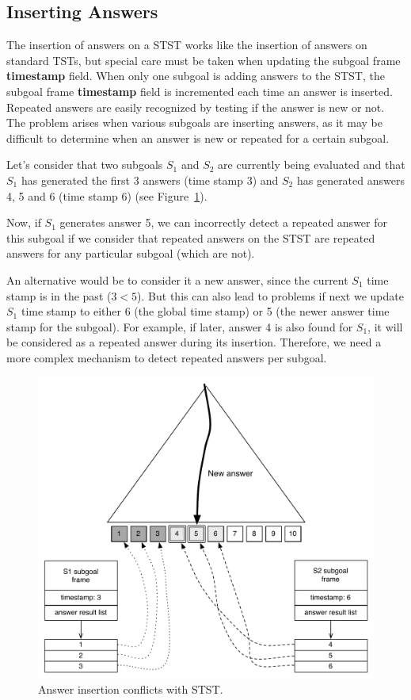 \subsection{Inserting Answers}

The insertion of answers on a STST works like the insertion of answers on standard TSTs, but special care
must be taken when updating the subgoal frame \textbf{timestamp} field.
When only one subgoal is adding answers to the STST, the subgoal frame \textbf{timestamp} field
is incremented each time an answer is inserted. Repeated answers are easily recognized
by testing if the answer is new or not. The problem arises when various subgoals are inserting answers,
as it may be difficult to determine when an answer is new or repeated for a certain subgoal.

Let's consider that two subgoals $S_1$ and $S_2$ are currently being evaluated and that $S_1$ has generated the
first 3 answers (time stamp 3) and $S_2$ has generated answers 4, 5 and 6 (time stamp 6) (see
Figure~\ref{fig:stst_conflicts}).

Now, if $S_1$ generates answer 5, we can incorrectly detect a repeated answer
for this subgoal if we consider that repeated answers on the STST are repeated answers for any
particular subgoal (which are not).

An alternative would be to consider it a new answer, since the current $S_1$ time stamp
is in the past ($3 < 5$). But this can also lead to problems if next we update $S_1$ time stamp
to either 6 (the global time stamp) or 5 (the newer answer time stamp for the subgoal).
For example, if later, answer 4 is also found for $S_1$, it will be considered as a repeated answer
during its insertion. Therefore, we need a more complex mechanism to
detect repeated answers per subgoal.

\begin{figure}[ht]
  \centering
    \includegraphics[scale=0.5]{stst_conflicts.pdf}
  \caption{Answer insertion conflicts with STST.}
  \label{fig:stst_conflicts}
\end{figure}

